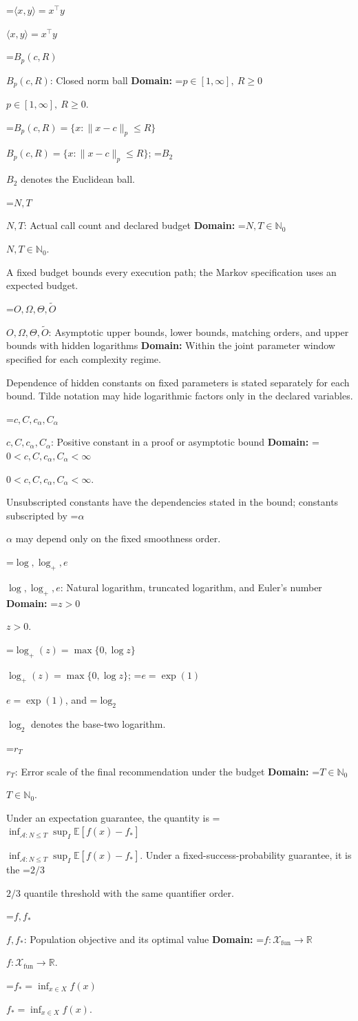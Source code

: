 \documentclass[10pt,a4paper]{article}
\newcommand{\AtlasMath}[1]{\par\begingroup\centering\setbox0=\hbox{$\displaystyle #1$}\ifdim\wd0>1.4\linewidth\typeout{ATLAS WIDE FORMULA: \the\wd0}\fi\ifdim\wd0>\linewidth\resizebox{\linewidth}{!}{\box0}\else\box0\fi\par\endgroup}
\newcommand{\AtlasInlineMath}[1]{\begingroup\setbox0=\hbox{$#1$}\ifdim\wd0>.4\linewidth\endgroup\AtlasMath{#1}\else\endgroup$#1$\fi}
\begin{document}
\AtlasInlineMath{\langle x,y\rangle=x^\top y}

\AtlasInlineMath{B_p(c,R)}: Closed norm ball \textbf{Domain:} \AtlasInlineMath{p\in[1,\infty],\ R\ge0}.

\AtlasInlineMath{B_p(c,R)=\{x:\|x-c\|_p\le R\}}; \AtlasInlineMath{B_2} denotes the Euclidean ball.

\AtlasInlineMath{N,T}: Actual call count and declared budget \textbf{Domain:} \AtlasInlineMath{N,T\in\mathbb{N}_0}.

A fixed budget bounds every execution path; the Markov specification uses an expected budget.

\AtlasInlineMath{O,\Omega,\Theta,\widetilde{O}}: Asymptotic upper bounds, lower bounds, matching orders, and upper bounds with hidden logarithms \textbf{Domain:} Within the joint parameter window specified for each complexity regime.

Dependence of hidden constants on fixed parameters is stated separately for each bound. Tilde notation may hide logarithmic factors only in the declared variables.

\AtlasInlineMath{c,C,c_\alpha,C_\alpha}: Positive constant in a proof or asymptotic bound \textbf{Domain:} \AtlasInlineMath{0<c,C,c_\alpha,C_\alpha<\infty}.

Unsubscripted constants have the dependencies stated in the bound; constants subscripted by \AtlasInlineMath{\alpha} may depend only on the fixed smoothness order.

\AtlasInlineMath{\log,\log_+,e}: Natural logarithm, truncated logarithm, and Euler's number \textbf{Domain:} \AtlasInlineMath{z>0}.

\AtlasInlineMath{\log_+(z)=\max\{0,\log z\}}; \AtlasInlineMath{e=\exp(1)}, and \AtlasInlineMath{\log_2} denotes the base-two logarithm.

\AtlasInlineMath{r_T}: Error scale of the final recommendation under the budget \textbf{Domain:} \AtlasInlineMath{T\in\mathbb{N}_0}.

Under an expectation guarantee, the quantity is \AtlasInlineMath{\inf_{\mathcal{A}:N\le T}\sup_I\mathbb{E}[f(\widehat{x})-f_*]}. Under a fixed-success-probability guarantee, it is the \AtlasInlineMath{2/3} quantile threshold with the same quantifier order.

\AtlasInlineMath{f,f_*}: Population objective and its optimal value \textbf{Domain:} \AtlasInlineMath{f:\mathcal{X}_{\mathrm{fun}}\to\mathbb{R}}.

\AtlasInlineMath{f_*=\inf_{x\in X}f(x)}.
\end{document}
